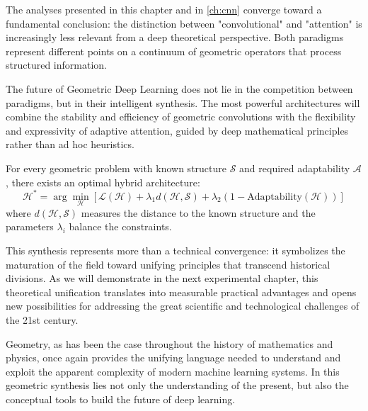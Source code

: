 The analyses presented in this chapter and in \autoref{ch:cnn} converge toward a fundamental conclusion: the distinction between "convolutional" and "attention" is increasingly less relevant from a deep theoretical perspective. Both paradigms represent different points on a continuum of geometric operators that process structured information.

The future of Geometric Deep Learning does not lie in the competition between paradigms, but in their intelligent synthesis. The most powerful architectures will combine the stability and efficiency of geometric convolutions with the flexibility and expressivity of adaptive attention, guided by deep mathematical principles rather than ad hoc heuristics.

\begin{remark}\label{rem:principio_sintesis}
For every geometric problem with known structure $\mathcal{S}$ and required adaptability $\mathcal{A}$, there exists an optimal hybrid architecture:
\begin{equation}
    \mathcal{H}^* = \arg\min_{\mathcal{H}} \left[ \mathcal{L}(\mathcal{H}) + \lambda_1 d(\mathcal{H}, \mathcal{S}) + \lambda_2 (1 - \text{Adaptability}(\mathcal{H})) \right]
\end{equation}
where $d(\mathcal{H}, \mathcal{S})$ measures the distance to the known structure and the parameters $\lambda_i$ balance the constraints.
\end{remark}

This synthesis represents more than a technical convergence: it symbolizes the maturation of the field toward unifying principles that transcend historical divisions. As we will demonstrate in the next experimental chapter, this theoretical unification translates into measurable practical advantages and opens new possibilities for addressing the great scientific and technological challenges of the 21st century.

Geometry, as has been the case throughout the history of mathematics and physics, once again provides the unifying language needed to understand and exploit the apparent complexity of modern machine learning systems. In this geometric synthesis lies not only the understanding of the present, but also the conceptual tools to build the future of deep learning.
